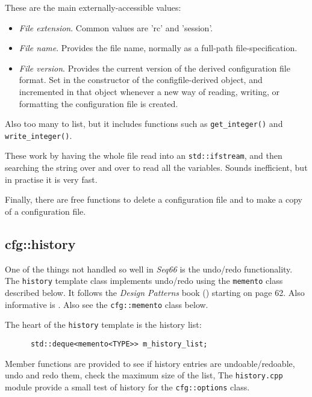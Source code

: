    These are the main externally-accessible values:

   \begin{itemize}
      \item \textsl{File extension}.
         Common values are 'rc' and 'session'.
      \item \textsl{File name}.
         Provides the file name, normally as a full-path file-specification.
      \item \textsl{File version}.
         Provides the current version of the derived configuration file format.
         Set in the constructor of the configfile-derived object,
         and incremented in that object whenever a new way of reading,
         writing, or formatting the configuration file is created.
   \end{itemize}

   Also too many to list, but it includes functions such as
   \texttt{get\_integer()} and \texttt{write\_integer()}.

   These work by having the whole file read into an
   \texttt{std::ifstream}, and then searching the string over and over
   to read all the variables.
   Sounds inefficient, but in practise it is very fast.

   Finally, there are free functions to delete a configuration file and
   to make a copy of a configuration file.

\subsection{cfg::history}
\label{subsec:cfg_namespace_history}

   One of the things not handled so well in \textsl{Seq66} is the
   undo/redo functionality.
   The \texttt{history} template class implements undo/redo using the 
   \texttt{memento} class described below. It follows
   the \textsl{Design Patterns} book (\cite{dpatterns}) starting on page 62.
   Also informative is \cite{deque}.
   Also see the \texttt{cfg::memento} class below.

   The heart of the \texttt{history} template is the history list:

   \begin{verbatim}
      std::deque<memento<TYPE>> m_history_list;
   \end{verbatim}

   Member functions are provided to see if history entries are
   undoable/redoable, undo and redo them, check the maximum size of the list,
   The \texttt{history.cpp} module provide a small test of history for
   the \texttt{cfg::options} class.

